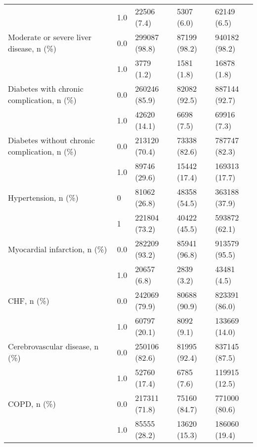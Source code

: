 \begin{tabular}{lllll}
                                       & 1.0 &               22506 (7.4) &         5307 (6.0) &        62149 (6.5) \\
Moderate or severe liver disease, n (\%) & 0.0 &             299087 (98.8) &       87199 (98.2) &      940182 (98.2) \\
                                       & 1.0 &                3779 (1.2) &         1581 (1.8) &        16878 (1.8) \\
Diabetes with chronic complication, n (\%) & 0.0 &             260246 (85.9) &       82082 (92.5) &      887144 (92.7) \\
                                       & 1.0 &              42620 (14.1) &         6698 (7.5) &        69916 (7.3) \\
Diabetes without chronic complication, n (\%) & 0.0 &             213120 (70.4) &       73338 (82.6) &      787747 (82.3) \\
                                       & 1.0 &              89746 (29.6) &       15442 (17.4) &      169313 (17.7) \\
Hypertension, n (\%) & 0 &              81062 (26.8) &       48358 (54.5) &      363188 (37.9) \\
                                       & 1 &             221804 (73.2) &       40422 (45.5) &      593872 (62.1) \\
Myocardial infarction, n (\%) & 0.0 &             282209 (93.2) &       85941 (96.8) &      913579 (95.5) \\
                                       & 1.0 &               20657 (6.8) &         2839 (3.2) &        43481 (4.5) \\
CHF, n (\%) & 0.0 &             242069 (79.9) &       80688 (90.9) &      823391 (86.0) \\
                                       & 1.0 &              60797 (20.1) &         8092 (9.1) &      133669 (14.0) \\
Cerebrovascular disease, n (\%) & 0.0 &             250106 (82.6) &       81995 (92.4) &      837145 (87.5) \\
                                       & 1.0 &              52760 (17.4) &         6785 (7.6) &      119915 (12.5) \\
COPD, n (\%) & 0.0 &             217311 (71.8) &       75160 (84.7) &      771000 (80.6) \\
                                       & 1.0 &              85555 (28.2) &       13620 (15.3) &      186060 (19.4) \\

\end{tabular}
